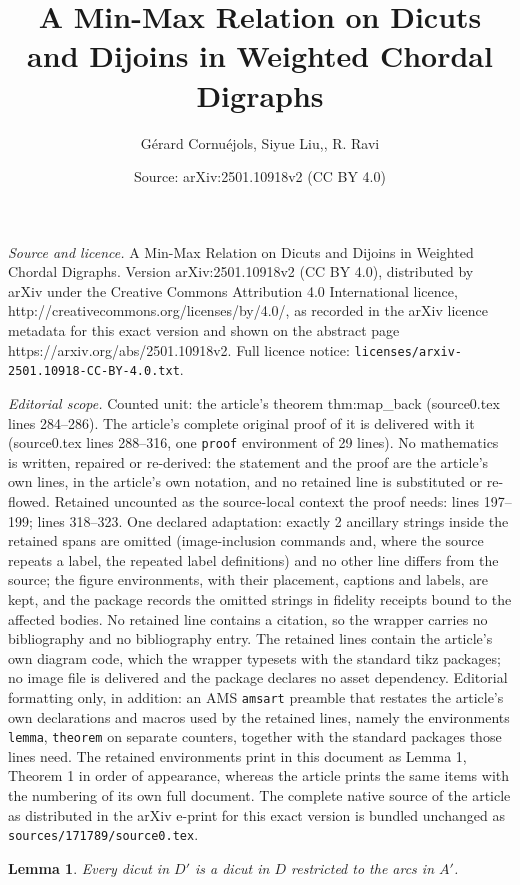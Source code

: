 \documentclass[10pt,a4paper]{amsart}
\title{A Min-Max Relation on Dicuts and Dijoins in Weighted Chordal Digraphs}
\author{G\'erard Cornu\'ejols, Siyue Liu,, R. Ravi}
\date{Source: arXiv:2501.10918v2 (CC BY 4.0)}
\newtheorem{lemma}{Lemma}
\begin{document}
\maketitle

\noindent\emph{Source and licence.} A Min-Max Relation on Dicuts and Dijoins in Weighted Chordal Digraphs. Version arXiv:2501.10918v2 (CC BY 4.0), distributed by arXiv under the Creative Commons Attribution 4.0 International licence, http://creativecommons.org/licenses/by/4.0/, as recorded in the arXiv licence metadata for this exact version and shown on the abstract page https://arxiv.org/abs/2501.10918v2. Full licence notice: \texttt{licenses/arxiv-2501.10918-CC-BY-4.0.txt}.\par\smallskip

\noindent\textit{Editorial scope.} Counted unit: the article's theorem thm:map\_back (source0.tex lines 284--286). The article's complete original proof of it is delivered with it (source0.tex lines 288--316, one \texttt{proof} environment of 29 lines). No mathematics is written, repaired or re-derived: the statement and the proof are the article's own lines, in the article's own notation, and no retained line is substituted or re-flowed.  Retained uncounted as the source-local context the proof needs: lines 197--199; lines 318--323.  One declared adaptation: exactly 2 ancillary strings inside the retained spans are omitted (image-inclusion commands and, where the source repeats a label, the repeated label definitions) and no other line differs from the source; the figure environments, with their placement, captions and labels, are kept, and the package records the omitted strings in fidelity receipts bound to the affected bodies.  No retained line contains a citation, so the wrapper carries no bibliography and no bibliography entry.  The retained lines contain the article's own diagram code, which the wrapper typesets with the standard tikz packages; no image file is delivered and the package declares no asset dependency.  Editorial formatting only, in addition: an AMS \texttt{amsart} preamble that restates the article's own declarations and macros used by the retained lines, namely the environments \texttt{lemma}, \texttt{theorem} on separate counters, together with the standard packages those lines need.  The retained environments print in this document as Lemma 1, Theorem 1 in order of appearance, whereas the article prints the same items with the numbering of its own full document.  The complete native source of the article as distributed in the arXiv e-print for this exact version is bundled unchanged as \texttt{sources/171789/source0.tex}.
\begin{lemma}\label{lemma:dicut_preserve}
    Every dicut in $D'$ is a dicut in $D$ restricted to the arcs in $A'$.
\end{lemma}
\end{document}
